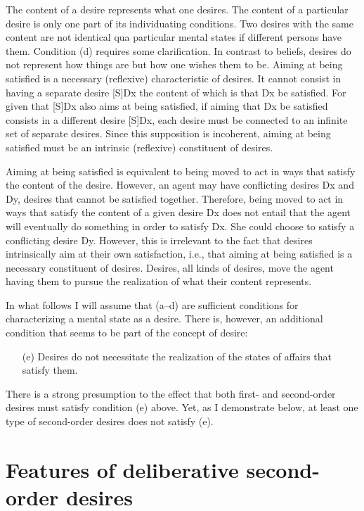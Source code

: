 \documentclass[output=paper]{langscibook}
\begin{document}
The content of a desire represents what one desires. The content of a particular desire is only one part of its individuating conditions. Two desires with the same content are not identical qua particular mental states if different persons have them. 
Condition (d) requires some clarification. In contrast to beliefs, desires do not represent how things are but how one wishes them to be. Aiming at being satisfied is a necessary (reflexive) characteristic of desires. It cannot consist in having a separate desire [S]Dx the content of which is that Dx be satisfied. For given that [S]Dx also aims at being satisfied, if aiming that Dx be satisfied consists in a different desire [S]Dx, each desire must be connected to an infinite set of separate desires. Since this supposition is incoherent, aiming at being satisfied must be an intrinsic (reflexive) constituent of desires. 

	Aiming at being satisfied is equivalent to being moved to act in ways that satisfy the content of the desire. However, an agent may have conflicting desires Dx and Dy, desires that cannot be satisfied together. Therefore, being moved to act in ways that satisfy the content of a given desire Dx does not entail that the agent will eventually do something in order to satisfy Dx. She could choose to satisfy a conflicting desire Dy. However, this is irrelevant to the fact that desires intrinsically aim at their own satisfaction, i.e., that aiming at being satisfied is a necessary constituent of desires. Desires, all kinds of desires, move the agent having them to pursue the realization of what their content represents.
	
In what follows I will assume that (a--d) are sufficient conditions for characterizing a mental state as a desire. There is, however, an additional condition that seems to be part of the concept of desire:

\begin{itemize}
\item[(e)]	Desires do not necessitate the realization of the states of affairs that satisfy them.
\end{itemize}

There is a strong presumption to the effect that both first- and second-order desires must satisfy condition (e) above. Yet, as I demonstrate below, at least one type of second-order desires does not satisfy (e). 

\section{Features of deliberative second-order desires}
\end{document}
